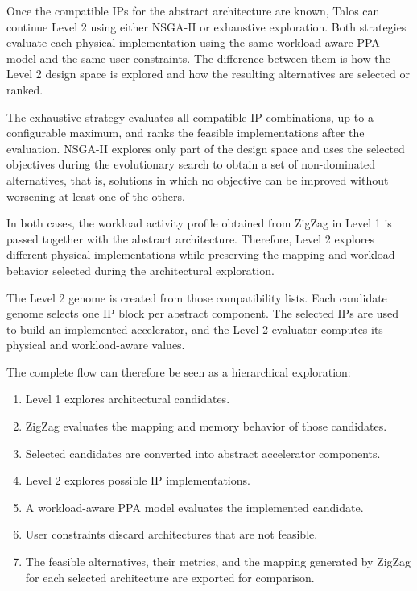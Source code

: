 Once the compatible IPs for the abstract architecture are known,
Talos can continue Level 2 using either NSGA-II or exhaustive
exploration. Both strategies evaluate each physical implementation
using the same workload-aware PPA model and the same user constraints.
The difference between them is how the Level 2 design space is
explored and how the resulting alternatives are selected or ranked.

The exhaustive strategy evaluates all compatible IP combinations, up
to a configurable maximum, and ranks the feasible implementations
after the evaluation. NSGA-II explores only part of the design space
and uses the selected objectives during the evolutionary search to
obtain a set of non-dominated alternatives, that is, solutions in
which no objective can be improved without worsening at least one of
the others.

In both cases, the workload activity profile obtained from ZigZag in
Level 1 is passed together with the abstract architecture. Therefore,
Level 2 explores different physical implementations while preserving
the mapping and workload behavior selected during the architectural
exploration.

The Level 2 genome is created from those compatibility lists. Each
candidate genome selects one IP block per abstract component. The
selected IPs are used to build an implemented accelerator, and the
Level 2 evaluator computes its physical and workload-aware values.

The complete flow can therefore be seen as a hierarchical exploration:

\begin{enumerate}
\item Level 1 explores architectural candidates.
\item ZigZag evaluates the mapping and memory behavior of those
candidates.
\item Selected candidates are converted into abstract accelerator
components.
\item Level 2 explores possible IP implementations.
\item A workload-aware PPA model evaluates the implemented candidate.
\item User constraints discard architectures that are not feasible.
\item The feasible alternatives, their metrics, and the mapping
generated by ZigZag for each selected architecture are exported for
comparison.
\end{enumerate}

